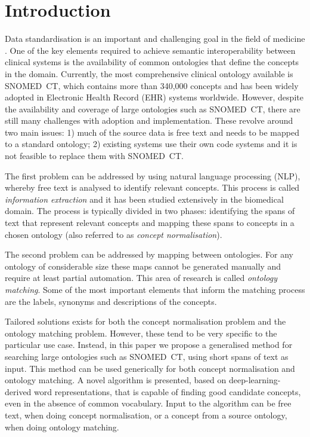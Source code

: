 \documentclass[preprint,12pt]{elsarticle}
\begin{document}







\section*{Introduction}
\label{sec:Introduction}

Data standardisation is an important and challenging goal in the field of medicine \cite{Benson2016}. One of the key elements required to achieve semantic interoperability between clinical systems is the availability of common ontologies that define the concepts in the domain. Currently, the most comprehensive clinical ontology available is SNOMED~CT, which contains more than 340,000 concepts and has been widely adopted in Electronic Health Record (EHR) systems worldwide. However, despite the availability and coverage of large ontologies such as SNOMED~CT, there are still many challenges with adoption and implementation. These revolve around two main issues: 1) much of the source data is free text and needs to be mapped to a standard ontology; 2) existing systems use their own code systems and it is not feasible to replace them with SNOMED~CT. 

The first problem can be addressed by using natural language processing (NLP), whereby free text is analysed to identify relevant concepts. This process is called \textit{information extraction} \cite{Jurafsky2009} and it has been studied extensively in the biomedical domain. The process is typically divided in two phases: identifying the spans of text that represent relevant concepts and mapping these spans to concepts in a chosen ontology (also referred to as \textit{concept normalisation}).

The second problem can be addressed by mapping between ontologies. For any ontology of considerable size these maps cannot be generated manually and require at least partial automation. This area of research is called \textit{ontology matching}\cite{Euzenat2013}. Some of the most important elements that inform the matching process are the labels, synonyms and descriptions of the concepts.

Tailored solutions exists for both the concept normalisation problem and the ontology matching problem. However, these tend to be very specific to the particular use case. Instead, in this paper we propose a generalised method for searching large ontologies such as SNOMED~CT, using short spans of text as input. This method can be used generically for both concept normalisation and ontology matching. A novel algorithm is presented, based on deep-learning-derived word representations, that is capable of finding good candidate concepts, even in the absence of common vocabulary. Input to the algorithm can be free text, when doing concept normalisation, or a concept from a source ontology, when doing ontology matching. 
\end{document}
